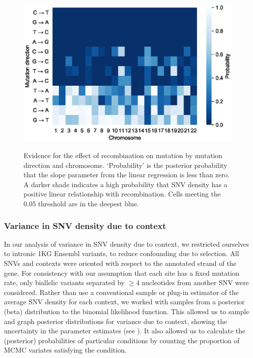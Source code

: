 \begin{figure}[h!]
\begin{center}
\includegraphics[width=1.0\columnwidth]{figs/heatmap.eps}
\caption{Evidence for the effect of recombination on mutation by mutation direction and chromosome.  `Probability' is the posterior probability that the slope parameter from the linear regression is less than zero. A darker shade indicates a high probability that SNV density has a positive linear relationship with recombination. Cells meeting the 0.05 threshold are in the deepest blue.}
{\label{fig:rcomb-heatmap}}
\end{center}
\end{figure}

\subsubsection*{Variance in SNV density due to context}

In our analysis of variance in SNV density due to context, we restricted ourselves to intronic 1KG Ensembl variants, to reduce confounding due to selection. All SNVs and contexts were oriented with respect to the annotated strand of the gene. For consistency with our assumption that each site has a fixed mutation rate, only biallelic variants separated by $\ge4$ nucleotides from another SNV were considered. Rather than use a conventional sample or plug-in estimator of the average SNV density for each context, we worked with samples from a posterior (beta) distribution to the binomial likelihood function. This allowed us to sample and graph posterior distributions for variance due to context, showing the uncertainty in the parameter estimates (see ). It also allowed us to calculate the (posterior) probabilities of particular conditions by counting the proportion of MCMC variates satisfying the condition.

